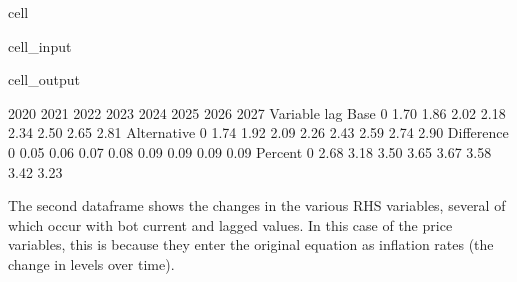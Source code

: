 \documentclass[letterpaper,10pt,english]{jupyterBook}
\begin{document}
\begin{sphinxuseclass}{cell}\begin{sphinxVerbatimInput}

\begin{sphinxuseclass}{cell_input}
\begin{sphinxVerbatim}[commandchars=\\\{\}]
 
\end{sphinxVerbatim}

\end{sphinxuseclass}\end{sphinxVerbatimInput}
\begin{sphinxVerbatimOutput}

\begin{sphinxuseclass}{cell_output}
\begin{sphinxVerbatim}[commandchars=\\\{\}]
                2020 2021 2022 2023 2024 2025 2026 2027
Variable    lag                                        
Base        0   1.70 1.86 2.02 2.18 2.34 2.50 2.65 2.81
Alternative 0   1.74 1.92 2.09 2.26 2.43 2.59 2.74 2.90
Difference  0   0.05 0.06 0.07 0.08 0.09 0.09 0.09 0.09
Percent     0   2.68 3.18 3.50 3.65 3.67 3.58 3.42 3.23
\end{sphinxVerbatim}

\end{sphinxuseclass}\end{sphinxVerbatimOutput}

\end{sphinxuseclass}
\sphinxAtStartPar
The second dataframe shows the changes in the various RHS variables, several of which occur with bot current and lagged values. In this case of the price variables, this is because they enter the original equation as inflation rates (the change in levels over time).
\end{document}
